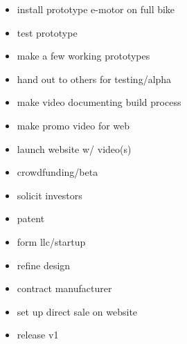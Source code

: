 \documentclass[11pt]{article} %
\begin{document}
\vspace{5mm}

\begin{itemize}
\item install prototype e-motor on full bike
\item test prototype
\end{itemize}

\vspace{5mm}

\begin{itemize}
\item make a few working prototypes
\item hand out to others for testing/alpha
\end{itemize}

\vspace{5mm}

\begin{itemize}
\item make video documenting build process
\item make promo video for web
\end{itemize}

\vspace{5mm}

\begin{itemize}
\item launch website w/ video(s)
\item crowdfunding/beta
\end{itemize}

\vspace{5mm}

\begin{itemize}
\item solicit investors
\item patent
\item form llc/startup
\end{itemize}

\vspace{5mm}

\begin{itemize}
\item refine design
\item contract manufacturer
\item set up direct sale on website
\end{itemize}

\vspace{5mm}

\begin{itemize}
\item release v1
\end{itemize}
\end{document}
